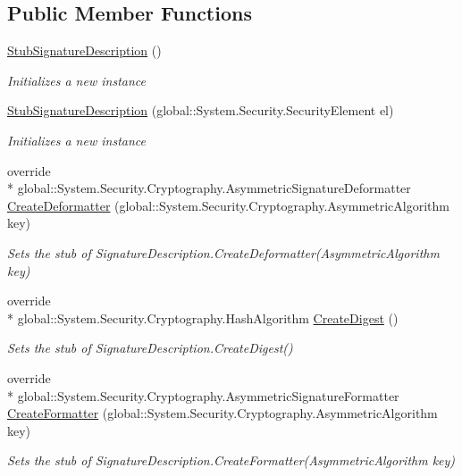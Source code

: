 \subsection*{Public Member Functions}
\begin{DoxyCompactItemize}
\item 
\hyperlink{class_system_1_1_security_1_1_cryptography_1_1_fakes_1_1_stub_signature_description_a77f7122ba600fe7e5194784248315ba4}{Stub\-Signature\-Description} ()
\begin{DoxyCompactList}\small\item\em Initializes a new instance\end{DoxyCompactList}\item 
\hyperlink{class_system_1_1_security_1_1_cryptography_1_1_fakes_1_1_stub_signature_description_a8c73e67b6e821ab4ea17f8274c54ad87}{Stub\-Signature\-Description} (global\-::\-System.\-Security.\-Security\-Element el)
\begin{DoxyCompactList}\small\item\em Initializes a new instance\end{DoxyCompactList}\item 
override \\*
global\-::\-System.\-Security.\-Cryptography.\-Asymmetric\-Signature\-Deformatter \hyperlink{class_system_1_1_security_1_1_cryptography_1_1_fakes_1_1_stub_signature_description_a640eedba38a7a70788a14f88b2091706}{Create\-Deformatter} (global\-::\-System.\-Security.\-Cryptography.\-Asymmetric\-Algorithm key)
\begin{DoxyCompactList}\small\item\em Sets the stub of Signature\-Description.\-Create\-Deformatter(\-Asymmetric\-Algorithm key)\end{DoxyCompactList}\item 
override \\*
global\-::\-System.\-Security.\-Cryptography.\-Hash\-Algorithm \hyperlink{class_system_1_1_security_1_1_cryptography_1_1_fakes_1_1_stub_signature_description_a6e4004ded9d9668e1331dcb5365504f9}{Create\-Digest} ()
\begin{DoxyCompactList}\small\item\em Sets the stub of Signature\-Description.\-Create\-Digest()\end{DoxyCompactList}\item 
override \\*
global\-::\-System.\-Security.\-Cryptography.\-Asymmetric\-Signature\-Formatter \hyperlink{class_system_1_1_security_1_1_cryptography_1_1_fakes_1_1_stub_signature_description_ae9b069f125a597329f2fcdacac93e517}{Create\-Formatter} (global\-::\-System.\-Security.\-Cryptography.\-Asymmetric\-Algorithm key)
\begin{DoxyCompactList}\small\item\em Sets the stub of Signature\-Description.\-Create\-Formatter(\-Asymmetric\-Algorithm key)\end{DoxyCompactList}\end{DoxyCompactItemize}
